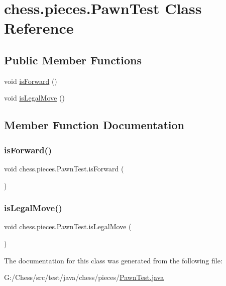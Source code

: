 \hypertarget{classchess_1_1pieces_1_1_pawn_test}{}\section{chess.\+pieces.\+Pawn\+Test Class Reference}
\label{classchess_1_1pieces_1_1_pawn_test}
\subsection*{Public Member Functions}
\begin{DoxyCompactItemize}
\item 
void \mbox{\hyperlink{classchess_1_1pieces_1_1_pawn_test_af7bce852ba8c7bec20ccb2e4d6f9eb4a}{is\+Forward}} ()
\item 
void \mbox{\hyperlink{classchess_1_1pieces_1_1_pawn_test_a9e6d9b70647e3c32edd75c206078c66d}{is\+Legal\+Move}} ()
\end{DoxyCompactItemize}


\subsection{Member Function Documentation}
\mbox{\label{classchess_1_1pieces_1_1_pawn_test_af7bce852ba8c7bec20ccb2e4d6f9eb4a}} 
\subsubsection{\texorpdfstring{is\+Forward()}{isForward()}}
{\footnotesize\ttfamily void chess.\+pieces.\+Pawn\+Test.\+is\+Forward (\begin{DoxyParamCaption}{ }\end{DoxyParamCaption})}

\mbox{\label{classchess_1_1pieces_1_1_pawn_test_a9e6d9b70647e3c32edd75c206078c66d}} 
\subsubsection{\texorpdfstring{is\+Legal\+Move()}{isLegalMove()}}
{\footnotesize\ttfamily void chess.\+pieces.\+Pawn\+Test.\+is\+Legal\+Move (\begin{DoxyParamCaption}{ }\end{DoxyParamCaption})}



The documentation for this class was generated from the following file\+:\begin{DoxyCompactItemize}
\item 
G\+:/\+Chess/src/test/java/chess/pieces/\mbox{\hyperlink{_pawn_test_8java}{Pawn\+Test.\+java}}\end{DoxyCompactItemize}
